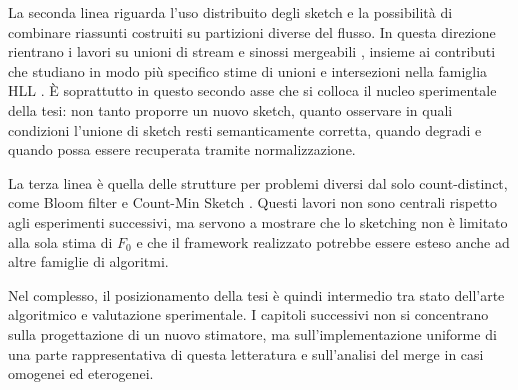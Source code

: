 La seconda linea riguarda l'uso distribuito degli sketch e la possibilità di
combinare riassunti costruiti su partizioni diverse del flusso. In questa
direzione rientrano i lavori su unioni di stream e sinossi mergeabili
\cite{Gibbons_Tirthapura_2001,Beyer_Haas_Reinwald_Sismanis_Gemulla_2007,Agarwal_Cormode_Huang_Phillips_Wei_Yi_2012},
insieme ai contributi che studiano in modo più specifico stime di unioni e
intersezioni nella famiglia HLL \cite{Ting_2016_UnionsIntersections,Ertl_2017_HLLAlgorithms}.
È soprattutto in questo secondo asse che si colloca il nucleo sperimentale della
tesi: non tanto proporre un nuovo sketch, quanto osservare in quali condizioni
l'unione di sketch resti semanticamente corretta, quando degradi e quando possa
essere recuperata tramite normalizzazione.

La terza linea è quella delle strutture per problemi diversi dal solo
count-distinct, come Bloom filter e Count-Min Sketch
\cite{Bloom_1970,Cormode_CountMinSketch_Encyclopedia}. Questi lavori non sono
centrali rispetto agli esperimenti successivi, ma servono a mostrare che lo
sketching non è limitato alla sola stima di \(F_0\) e che il framework
realizzato potrebbe essere esteso anche ad altre famiglie di algoritmi.

Nel complesso, il posizionamento della tesi è quindi intermedio tra stato
dell'arte algoritmico e valutazione sperimentale. I capitoli successivi non si
concentrano sulla progettazione di un nuovo stimatore, ma sull'implementazione
uniforme di una parte rappresentativa di questa letteratura e sull'analisi del
merge in casi omogenei ed eterogenei.
